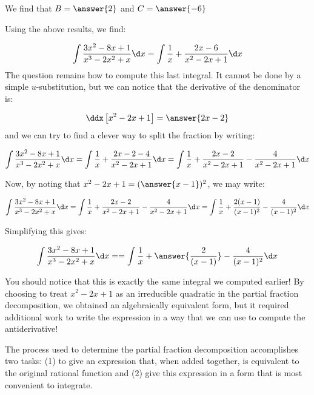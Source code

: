 \documentclass{ximera}
\begin{document}
\begin{exercise}
\begin{exercise}
\begin{exercise}
\begin{exercise}
\begin{exercise}
\begin{exercise}
We find that $B=\answer{2}$ and $C=\answer{-6}$

\begin{exercise}
Using the above results, we find:

 \[
 \int \frac{3x^2-8x+1}{x^3-2x^2+x} \d x =\int \frac{1}{x}+\frac{2x-6}{x^2-2x+1} \d x
\]
The question remains how to compute this last integral.  It cannot be done by a simple $u$-substitution, but we can notice that the derivative of the denominator is:

\[ \ddx \left[x^2-2x+1\right] = \answer{2x-2}
\]
and we can try to find a clever way to split the fraction by writing:

\[
 \int \frac{3x^2-8x+1}{x^3-2x^2+x} \d x =\int \frac{1}{x}+\frac{2x-2-4}{x^2-2x+1} \d x=\int \frac{1}{x}+\frac{2x-2}{x^2-2x+1} -\frac{4}{x^2-2x+1} \d x
\]

Now, by noting that $x^2-2x+1 = (\answer{x-1})^2$, we may write:

\[
 \int \frac{3x^2-8x+1}{x^3-2x^2+x} \d x =\int \frac{1}{x}+\frac{2x-2}{x^2-2x+1} -\frac{4}{x^2-2x+1} \d x =\int \frac{1}{x}+\frac{2(x-1)}{(x-1)^2} -\frac{4}{(x-1)^2} \d x
\]

Simplifying this gives:

\[
 \int \frac{3x^2-8x+1}{x^3-2x^2+x} \d x = =\int \frac{1}{x}+\answer{\frac{2}{(x-1)}} -\frac{4}{(x-1)^2} \d x
\]

\begin{exercise}
You should notice that this is exactly the same integral we computed earlier!  By choosing to treat $x^2-2x+1$ as an irreducible quadratic in the partial fraction decomposition, we obtained an algebraically equivalent form, but it required additional work to write the expression in a way that we can use to compute the antiderivative!

The process used to determine the partial fraction decomposition accomplishes two tasks: (1) to give an expression that, when  added together, is equivalent to the original rational function and (2) give this expression in a form that is most convenient to integrate.

\end{exercise}


\end{exercise}
\end{exercise}
\end{exercise}
\end{exercise}
\end{exercise}
\end{exercise}
\end{exercise}
\end{document}
